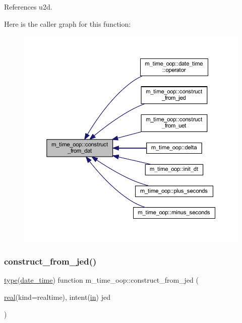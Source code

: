 References u2d.

Here is the caller graph for this function\+:
\nopagebreak
\begin{figure}[H]
\begin{center}
\leavevmode
\includegraphics[width=350pt]{namespacem__time__oop_ae43c4146d74863b5aee027ebc0103f48_icgraph}
\end{center}
\end{figure}
\mbox{\label{namespacem__time__oop_ac7d9aa1885c2b8df613541be8a147064}} 
\subsubsection{\texorpdfstring{construct\+\_\+from\+\_\+jed()}{construct\_from\_jed()}}
{\footnotesize\ttfamily \hyperlink{stop__watch_83_8txt_a70f0ead91c32e25323c03265aa302c1c}{type}(\hyperlink{structm__time__oop_1_1date__time}{date\+\_\+time}) function m\+\_\+time\+\_\+oop\+::construct\+\_\+from\+\_\+jed (\begin{DoxyParamCaption}\item[{\hyperlink{read__watch_83_8txt_abdb62bde002f38ef75f810d3a905a823}{real}(kind=realtime), intent(\hyperlink{M__journal_83_8txt_afce72651d1eed785a2132bee863b2f38}{in})}]{jed }\end{DoxyParamCaption})\hspace{0.3cm}{\ttfamily [private]}}



